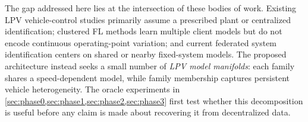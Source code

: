 The gap addressed here lies at the intersection of these bodies of work. Existing
LPV vehicle-control studies primarily assume a prescribed plant or centralized
identification; clustered FL methods learn multiple client models but do not
encode continuous operating-point variation; and current federated system
identification centers on shared or nearby fixed-system models. The proposed
architecture instead seeks a small number of \emph{LPV model manifolds}: each
family shares a speed-dependent model, while family membership captures persistent
vehicle heterogeneity. The oracle experiments in
\cref{sec:phase0,sec:phase1,sec:phase2,sec:phase3} first test whether this
decomposition is useful before any claim is made about recovering it from
decentralized data.
